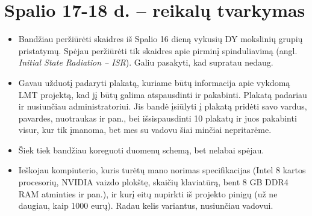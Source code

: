 \documentclass[a4paper, 12pt]{article}
\begin{document}
\section{Spalio 17-18 d. -- reikalų tvarkymas}
\begin{itemize}
	\item Bandžiau peržiūrėti skaidres iš Spalio 16 dieną vykusių DY mokslinių
	grupių pristatymų. Spėjau peržiūrėti tik skaidres apie pirminį spinduliavimą
	(angl. \textit{Initial State Radiation -- ISR}). Galiu pasakyti, kad supratau
	nedaug.
	\item Gavau užduotį padaryti plakatą, kuriame būtų informacija apie vykdomą
	LMT projektą, kad jį būtų galima atspausdinti ir pakabinti. Plakatą padariau
	ir nusiunčiau administratoriui. Jis bandė įsiūlyti į plakatą pridėti savo
	vardus, pavardes, nuotraukas ir pan., bei išsispausdinti 10 plakatų ir juos
	pakabinti visur, kur tik įmanoma, bet mes su vadovu šiai minčiai nepritarėme.
	\item Šiek tiek bandžiau koreguoti duomenų schemą, bet nelabai spėjau.
	\item Ieškojau kompiuterio, kuris turėtų mano norimas specifikacijas
	(Intel 8 kartos procesorių, NVIDIA vaizdo plokštę, skaičių klaviatūrą, bent
	8 GB DDR4 RAM atminties ir pan.), ir kurį eitų nupirkti iš projekto pinigų
	(už ne daugiau, kaip 1000 eurų). Radau kelis variantus, nusiunčiau vadovui.
\end{itemize}
\end{document}
